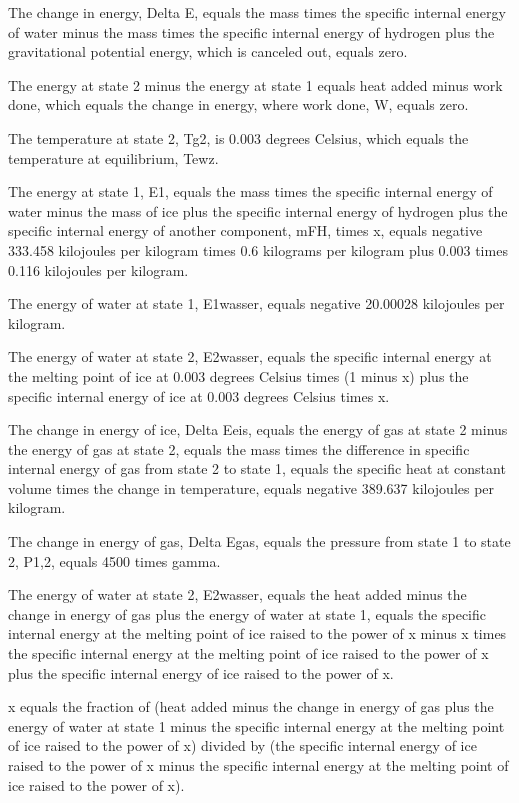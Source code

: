 The change in energy, Delta E, equals the mass times the specific internal energy of water minus the mass times the specific internal energy of hydrogen plus the gravitational potential energy, which is canceled out, equals zero.

The energy at state 2 minus the energy at state 1 equals heat added minus work done, which equals the change in energy, where work done, W, equals zero.

The temperature at state 2, Tg2, is 0.003 degrees Celsius, which equals the temperature at equilibrium, Tewz.

The energy at state 1, E1, equals the mass times the specific internal energy of water minus the mass of ice plus the specific internal energy of hydrogen plus the specific internal energy of another component, mFH, times x, equals negative 333.458 kilojoules per kilogram times 0.6 kilograms per kilogram plus 0.003 times 0.116 kilojoules per kilogram.

The energy of water at state 1, E1wasser, equals negative 20.00028 kilojoules per kilogram.

The energy of water at state 2, E2wasser, equals the specific internal energy at the melting point of ice at 0.003 degrees Celsius times (1 minus x) plus the specific internal energy of ice at 0.003 degrees Celsius times x.

The change in energy of ice, Delta Eeis, equals the energy of gas at state 2 minus the energy of gas at state 2, equals the mass times the difference in specific internal energy of gas from state 2 to state 1, equals the specific heat at constant volume times the change in temperature, equals negative 389.637 kilojoules per kilogram.

The change in energy of gas, Delta Egas, equals the pressure from state 1 to state 2, P1,2, equals 4500 times gamma.

The energy of water at state 2, E2wasser, equals the heat added minus the change in energy of gas plus the energy of water at state 1, equals the specific internal energy at the melting point of ice raised to the power of x minus x times the specific internal energy at the melting point of ice raised to the power of x plus the specific internal energy of ice raised to the power of x.

x equals the fraction of (heat added minus the change in energy of gas plus the energy of water at state 1 minus the specific internal energy at the melting point of ice raised to the power of x) divided by (the specific internal energy of ice raised to the power of x minus the specific internal energy at the melting point of ice raised to the power of x).
